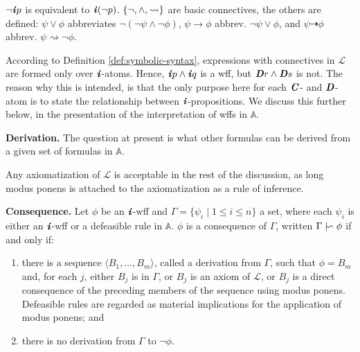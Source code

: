 \documentclass[10pt, conference, compsocconf]{IEEEtran}
\begin{document}
\begin{remark}
$\neg\textbf{\textit{i}}p$ is equivalent to $\textbf{\textit{i}}(\neg p)$. $\{ \neg, \wedge, \rightsquigarrow \}$ are basic connectives, the others are defined: $\psi \vee \phi$ abbreviates $\neg(\neg \psi \wedge \neg \phi)$, $\psi \rightarrow \phi$ abbrev. $\neg\psi \vee \phi$, and $\psi \dashrightarrow \phi$ abbrev. $\psi \rightsquigarrow \neg\phi$.
\end{remark}

\begin{remark}
According to Definition \ref{def:symbolic-syntax}, expressions with connectives in $\mathcal{L}$ are formed only over $\textbf{\textit{i}}$-atoms. Hence, $\textbf{\textit{i}}p \wedge \textbf{\textit{i}}q$ is a wff, but $\textbf{\textit{D}}r \wedge \textbf{\textit{D}}s$ is not. The reason why this is intended, is that the only purpose here for each $\textbf{\textit{C}}$- and $\textbf{\textit{D}}$-atom is to state the relationship between $\textbf{\textit{i}}$-propositions. We discuss this further below, in the presentation of the interpretation of wffs in $\mathbb{A}$.
\end{remark}


\textbf{Derivation.} The question at present is what other formulas can be derived from a given set of formulas in $\mathbb{A}$. 


\begin{remark}
Any axiomatization of $\mathcal{L}$ is acceptable in the rest of the discussion, as long modus ponens is attached to the axiomatization as a rule of inference. 
\end{remark}

\begin{definition}\label{def:derivation}
	\textbf{Consequence.} Let $\phi$ be an $\textbf{\textit{i}}$-wff and $\Gamma = \{ \psi_{i} \mid 1 \leq i \leq n \}$ a set, where each $\psi_{i}$ is either an $\textbf{\textit{i}}$-wff or a defeasible rule in $\mathbb{A}$. $\phi$ is a consequence of $\Gamma$, written $\Gamma \mid\negthinspace\backsim \phi$ if and only if:
	\begin{enumerate}
		\item{there is a sequence $\langle B_{1}, \ldots, B_{m} \rangle$, called a derivation from $\Gamma$, such that $\phi = B_{m}$ and, for each $j$, either $B_{j}$ is in $\Gamma$, or $B_{j}$ is an axiom of $\mathcal{L}$, or $B_{j}$ is a direct consequence of the preceding members of the sequence using modus ponens. Defeasible rules are regarded as material implications for the application of modus ponens; and}
		\item{there is no derivation from $\Gamma$ to $\neg\phi$.}
	\end{enumerate}
\end{definition}
\end{document}
